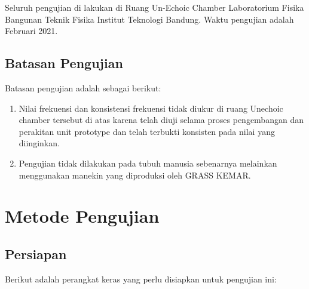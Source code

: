 \documentclass[12pt,]{article}
\begin{document}
	Seluruh pengujian di lakukan di Ruang Un-Echoic Chamber Laboratorium Fisika Bangunan Teknik Fisika
	Institut Teknologi Bandung. Waktu pengujian adalah Februari 2021.

	\subsection{Batasan Pengujian}

	Batasan pengujian adalah sebagai berikut:

	\begin{enumerate}
		\item Nilai frekuensi dan konsistensi frekuensi tidak diukur di ruang Unechoic chamber tersebut di atas
		karena telah diuji selama proses pengembangan dan perakitan unit prototype dan telah terbukti konsisten pada nilai yang diinginkan.

		\item Pengujian tidak dilakukan pada tubuh manusia sebenarnya melainkan menggunakan manekin yang diproduksi oleh GRASS KEMAR.
	\end{enumerate}


	\newpage
	\section{Metode Pengujian}

	\subsection{Persiapan}

	Berikut adalah perangkat keras yang perlu disiapkan untuk pengujian ini:
\end{document}
